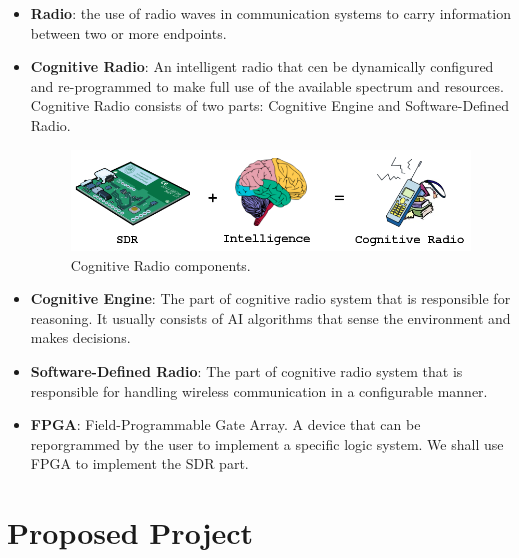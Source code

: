 \documentclass[]{scrartcl}
\begin{document}
\begin{itemize}

\item
\textbf{Radio}: the use of radio waves in communication systems to carry
information between two or more endpoints.\\

\item
\textbf{Cognitive Radio}: An intelligent radio that cen be dynamically
configured and re-programmed to make full use of the available spectrum
and resources. Cognitive Radio consists of two parts: Cognitive Engine
and Software-Defined Radio.\\

\begin{figure}[H]
\begin{center}
  \includegraphics[scale=0.61]{cognitive2.png}
  \caption{Cognitive Radio components.}
\end{center}
\end{figure}

\item
\textbf{Cognitive Engine}: The part of cognitive radio system that is 
responsible for reasoning. It usually consists of AI algorithms that sense the
environment and makes decisions. \\

\item
\textbf{Software-Defined Radio}: The part of cognitive radio system that
is responsible for handling wireless communication in a configurable manner. \\

\item
\textbf{FPGA}: Field-Programmable Gate Array. A device that can be 
reporgrammed by the user to implement a specific logic system. We shall
use FPGA to implement the SDR part.\\

\end{itemize}

\section{Proposed Project}
\end{document}
